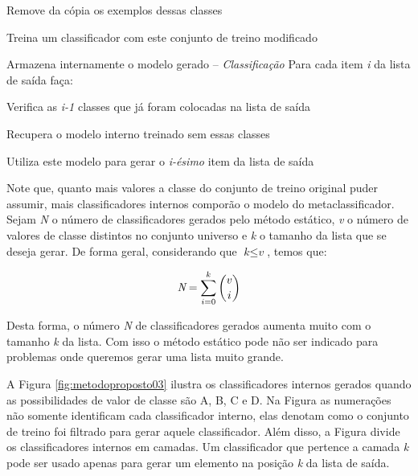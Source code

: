 \quad Remove da cópia os exemplos dessas classes

\quad Treina um classificador com este conjunto de treino modificado

\quad Armazena internamente o modelo gerado\newline
-- \textit{Classificação}\newline
Para cada item \textit{i} da lista de saída faça:

\quad Verifica as \textit{i-1} classes que já foram colocadas na lista de saída

\quad Recupera o modelo interno treinado sem essas classes

\quad Utiliza este modelo para gerar o \textit{i-ésimo} item da lista de saída

\hfill \break

Note que, quanto mais valores a classe do conjunto de treino original puder assumir, mais classificadores internos comporão o modelo do metaclassificador.
Sejam \textit{N} o número de classificadores gerados pelo método estático, \textit{v} o número de valores de classe distintos no conjunto universo e \textit{k} o tamanho da lista que se deseja gerar. 
De forma geral, considerando que $\textit{k} \leq \textit{v}$, temos que:

\begin{equation*}
\centering
\textit{N} = \sum\limits_{i=0}^k \binom{v}{i}
\end{equation*}

Desta forma, o número \textit{N} de classificadores gerados aumenta muito com o tamanho \textit{k} da lista.
Com isso o método estático pode não ser indicado para problemas onde queremos gerar uma lista muito grande.

A Figura \ref{fig:metodoproposto03} ilustra os classificadores internos gerados quando as possibilidades de valor de classe são A, B, C e D. Na Figura as numerações não somente identificam cada classificador interno, elas denotam como o conjunto de treino foi filtrado para gerar aquele classificador. Além disso, a Figura divide os classificadores internos em camadas. Um classificador que pertence a camada \textit{k} pode ser usado apenas para gerar um elemento na posição \textit{k} da lista de saída.


